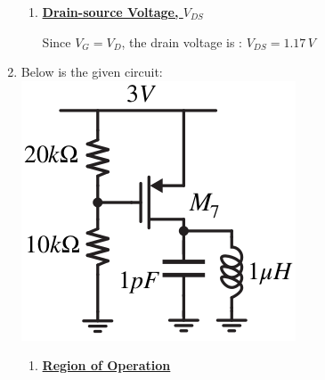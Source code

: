 \documentclass[12pt, fleqn]{article}
\begin{document}
\begin{enumerate}[label=(\alph*)]
{\begin{enumerate}[label=(\roman*)]
        \begin{equation}
            2\,{V_G}^2 - 4\phi\,V_G - 0.75 = 0
        \end{equation}
        
        There are two solutions, one of which is negative.  Since a negative gate voltage would violate the conditions for saturation (the transistor would be in cut-off), we choose the positive solution of $V_G = 2.17\,V$.
        
        \vspace{0.25cm}
        Now we can plug in values to solve for the drain current:
        \begin{align*}
            I_D &= \left(\frac{W}{2L}\right) \mu_n\,C_{ox} {\big(V_{GS} - V_{T_n}\big)}^2\\[0.25cm]
            &= \left(10 \cdot 200\,\mu A/V^2\right) {\big(1.17\,V - 0.5\,V\big)}^2\\[0.25cm]
            \Aboxed{&= 0.8978\,mA}
        \end{align*}
        \item
        {
        \underline{\textbf{Drain-source Voltage, $V_{DS}$}}
        
        \vspace{0.15cm}
        Since $V_G = V_D$, the drain voltage is : $\boxed{V_{DS} = 1.17\,V}$
        }
    \end{enumerate}
    }
    \newpage\noindent
    \item
    {
    Below is the given circuit:\\
    \includegraphics[scale=0.55, center]{p1f.png}\\
    \begin{enumerate}[label=(\roman*)]
        \item
        {
        \underline{\textbf{Region of Operation}}
        
}
\end{enumerate}}
\end{enumerate}
\end{document}
